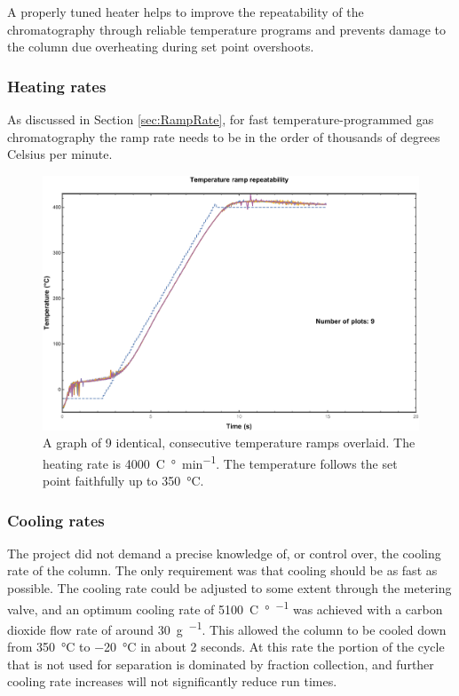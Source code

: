 A properly tuned heater helps to improve the repeatability of the chromatography
through reliable temperature programs and prevents damage to the column due
overheating during set point overshoots.

\subsubsection{Heating rates}

As discussed in Section \ref{sec:RampRate}, for fast temperature-programmed gas
chromatography the ramp rate needs to be in the order of thousands of degrees
Celsius per minute.

\begin{figure}
	\centering
	\includegraphics[angle=90, origin=c, width=\textwidth]{Figures/high_rate_heating.pdf}
	\decoRule
		
	\caption[Heating rate illustration]{A graph of 9 identical, consecutive
	temperature ramps overlaid. The heating rate is \SI{4000}{C\degree\per\minute}.
	The temperature follows the set point faithfully up to \SI{350}{\celsius}.}

	\label{fig:LoopTuning} 
\end{figure}

\subsubsection{Cooling rates}

The project did not demand a precise knowledge of, or control over, the cooling
rate of the column. The only requirement was that cooling should be as fast as
possible. The cooling rate could be adjusted to some extent through the metering
valve, and an optimum cooling rate of \SI{5100}{C\degree\per\min} was achieved
with a carbon dioxide flow rate of around \SI{30}{\gram\per\min}. This allowed
the column to be cooled down from \SI{350}{\celsius} to \SI{-20}{\celsius} in
about 2 seconds. At this rate the portion of the cycle that is not used for
separation is dominated by fraction collection, and further cooling rate
increases will not significantly reduce run times.

